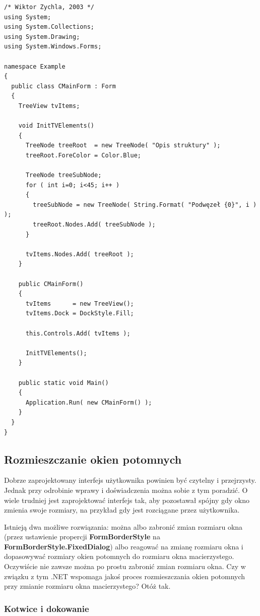\begin{scriptsize}
\begin{verbatim}
/* Wiktor Zychla, 2003 */
using System;
using System.Collections;
using System.Drawing;
using System.Windows.Forms;

namespace Example
{
  public class CMainForm : Form
  {   
    TreeView tvItems;

    void InitTVElements()
    {
      TreeNode treeRoot  = new TreeNode( "Opis struktury" );
      treeRoot.ForeColor = Color.Blue;

      TreeNode treeSubNode;
      for ( int i=0; i<45; i++ )
      {
        treeSubNode = new TreeNode( String.Format( "Podwęzeł {0}", i ) );
        treeRoot.Nodes.Add( treeSubNode );
      }   

      tvItems.Nodes.Add( treeRoot );
    } 

    public CMainForm()
    {
      tvItems      = new TreeView();
      tvItems.Dock = DockStyle.Fill;
     
      this.Controls.Add( tvItems );

      InitTVElements();
    } 

    public static void Main()
    {
      Application.Run( new CMainForm() );
    }
  }
}
\end{verbatim}
\end{scriptsize}

\subsection{Rozmieszczanie okien potomnych}

Dobrze zaprojektowany interfejs użytkownika powinien być czytelny i przejrzysty. Jednak przy odrobinie
wprawy i doświadczenia można sobie z tym poradzić. O wiele trudniej jest zaprojektować interfejs tak, aby
pozostawał spójny gdy okno zmienia swoje rozmiary, na przykład gdy jest rozciągane przez użytkownika.

Istnieją dwa możliwe rozwiązania: można albo zabronić zmian rozmiaru okna (przez ustawienie
propercji {\bf FormBorderStyle} na {\bf FormBorderStyle.FixedDialog}) albo reagować na zmianę rozmiaru
okna i dopasowywać rozmiary okien potomnych do rozmiaru okna macierzystego. Oczywiście nie zawsze można
po prostu zabronić zmian rozmiaru okna. Czy w związku z tym .NET wspomaga jakoś proces rozmieszczania
okien potomnych przy zmianie rozmiaru okna macierzystego? Otóż tak. 

\subsubsection{Kotwice i dokowanie}


